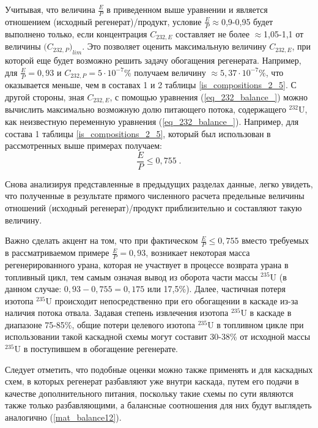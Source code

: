 Учитывая, что величина $\frac{E}{P}$ в приведенном выше уравнении и является отношением (исходный регенерат)/продукт, условие $\frac{E}{P}\approx$0,9-0,95 будет выполнено только, если концентрация $C_{232,E}$ составляет не более $\approx$1,05-1,1 от величины ${{(}{C_{232,P}}{)}}_{lim}$. Это позволяет оценить максимальную величину $C_{232,E}$, при которой еще будет возможно решить задачу обогащения регенерата. Например, для $\frac{E}{P}=0,93$ и $C_{232,P}=5\cdot10^{-7}\%$ получаем величину $\approx 5,37\cdot10^{-7}\%$, что оказывается меньше, чем в составах 1 и 2 таблицы \ref{is_compositions_2_5}. С другой стороны, зная $C_{232,E}$, с помощью уравнения (\ref{eq_232_balance_}) можно вычислить максимально возможную долю питающего потока, содержащего $^{232}$U, как неизвестную переменную уравнения (\ref{eq_232_balance_}). Например, для состава 1 таблицы \ref{is_compositions_2_5}, который был использован в рассмотренных выше примерах получаем:
\begin{equation}
  \label{eq_232_balance_X_}
    \frac{E}{P} \leq 0,755 \; .
\end{equation}

Снова анализируя представленные в предыдущих разделах данные, легко увидеть, что полученные в результате прямого численного расчета предельные величины отношений (исходный регенерат)/продукт приблизительно и составляют такую величину.

Важно сделать акцент на том, что при фактическом $\frac{E}{P}\leq 0,755$ вместо требуемых в рассматриваемом примере $\frac{E}{P}=0,93$, возникает некоторая масса регенерированного урана, которая не участвует в процессе возврата урана в топливный цикл, тем самым означая вывод из оборота части массы $^{235}$U (в данном случае: $0,93-0,755=0,175$ или 17,5\%). Далее, частичная потеря изотопа $^{235}$U происходит непосредственно при его обогащении в каскаде из-за наличия потока отвала. Задавая степень извлечения изотопа $^{235}$U в каскаде в диапазоне 75-85\%, общие потери целевого изотопа $^{235}$U в топливном цикле при использовании такой каскадной схемы могут составит 30-38\% от исходной массы $^{235}$U в поступившем в обогащение регенерате.

Следует отметить, что подобные оценки можно также применять и для каскадных схем, в которых регенерат разбавляют уже внутри каскада, путем его подачи в качестве дополнительного питания, поскольку такие схемы по сути являются также только разбавляющими, а балансные соотношения для них будут выглядеть аналогично (\ref{mat_balance12}).


